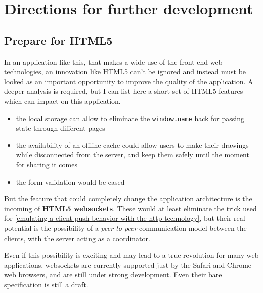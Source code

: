 \documentclass[10pt,a4paper,english]{book}
\begin{document}

\hypertarget{directions-for-further-development}{}
\chapter{Directions for further development}
\label{directions-for-further-development}



\hypertarget{prepare-for-html5}{}
\section{Prepare for HTML5}
\label{prepare-for-html5}

In an application like this, that makes a wide use of the front-end
web technologies, an innovation like HTML5 can't be ignored and
instead must be looked as an important opportunity to improve the
quality of the application. A deeper analysis is required, but I can
list here a short set of HTML5 features which can impact on this
application.
\begin{itemize}
\item {} 
the local storage can allow to eliminate the \texttt{window.name} hack
for passing state through different pages

\item {} 
the availability of an offline cache could allow users to make their
drawings while disconnected from the server, and keep them safely
until the moment for sharing it comes\footnotemark[8]

\item {} 
the form validation would be eased

\end{itemize}

But the feature that could completely change the application
architecture is the incoming of \textbf{HTML5 websockets}. These would at
least eliminate the trick used for \href{\#emulating-a-client-push-behavior-with-the-http-technology}{\ref*{emulating-a-client-push-behavior-with-the-http-technology}}, but their real potential is the
possibility of a \emph{peer to peer} communication model between the
clients, with the server acting as a coordinator.

Even if this possibility is exciting and may lead to a true revolution
for many web applications, websockets are currently supported just by
the Safari and Chrome web browsers, and are still under strong
development. Even their bare
\href{http://dev.w3.org/html5/websockets/}{specification} is still a
draft.
\end{document}
